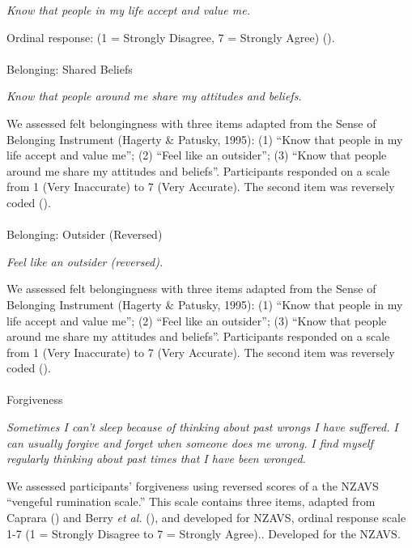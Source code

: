 \documentclass[
  single column]{article}
\makeatletter
\let\oldparagraph\paragraph
\renewcommand{\paragraph}{
    \@ifstar
      \xxxParagraphStar
      \xxxParagraphNoStar
  }
\newcommand{\xxxParagraphStar}[1]{\oldparagraph*{#1}\mbox{}}
\newcommand{\xxxParagraphNoStar}[1]{\oldparagraph{#1}\mbox{}}
\makeatother
\begin{document}
\emph{Know that people in my life accept and value me.}

Ordinal response: (1 = Strongly Disagree, 7 = Strongly Agree)
().

\paragraph{Belonging: Shared Beliefs}\label{belonging-shared-beliefs}

\emph{Know that people around me share my attitudes and beliefs.}

We assessed felt belongingness with three items adapted from the Sense
of Belonging Instrument (Hagerty \& Patusky, 1995): (1) ``Know that
people in my life accept and value me''; (2) ``Feel like an outsider'';
(3) ``Know that people around me share my attitudes and beliefs''.
Participants responded on a scale from 1 (Very Inaccurate) to 7 (Very
Accurate). The second item was reversely coded
().

\paragraph{Belonging: Outsider
(Reversed)}\label{belonging-outsider-reversed}

\emph{Feel like an outsider (reversed).}

We assessed felt belongingness with three items adapted from the Sense
of Belonging Instrument (Hagerty \& Patusky, 1995): (1) ``Know that
people in my life accept and value me''; (2) ``Feel like an outsider'';
(3) ``Know that people around me share my attitudes and beliefs''.
Participants responded on a scale from 1 (Very Inaccurate) to 7 (Very
Accurate). The second item was reversely coded
().

\paragraph{Forgiveness}\label{forgiveness-1}

\emph{Sometimes I can't sleep because of thinking about past wrongs I
have suffered.} \emph{I can usually forgive and forget when someone does
me wrong.} \emph{I find myself regularly thinking about past times that
I have been wronged.}

We assessed participants' forgiveness using reversed scores of a the
NZAVS ``vengeful rumination scale.'' This scale contains three items,
adapted from Caprara () and
Berry \emph{et al.} (), and
developed for NZAVS, ordinal response scale 1-7 (1 = Strongly Disagree
to 7 = Strongly Agree).. Developed for the NZAVS.
\end{document}
